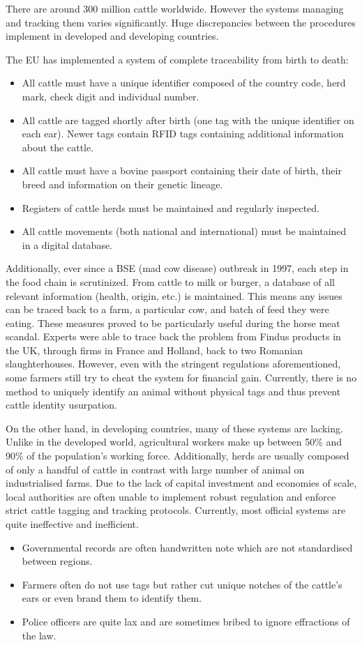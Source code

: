 There are around 300 million cattle worldwide. However the systems managing and tracking them varies significantly. Huge discrepancies between the procedures implement in developed and developing countries.

The EU has implemented a system of complete traceability from birth to death:
\begin{itemize}
	\item All cattle must have a unique identifier composed of the country code, herd mark, check digit and individual number.
	\item All cattle are tagged shortly after birth (one tag with the unique identifier on each ear). Newer tags contain RFID tags containing additional information about the cattle. 
	\item All cattle must have a bovine passport containing their date of birth, their breed and information on their genetic lineage.
	\item Registers of cattle herds must be maintained and regularly inspected.
	\item All cattle movements (both national and international) must be maintained in a digital database.
\end{itemize}

Additionally, ever since a BSE (mad cow disease) outbreak in 1997, each step in the food chain is scrutinized. From cattle to milk or burger, a database of all relevant information (health, origin, etc.) is maintained. This means any issues can be traced back to a farm, a particular cow, and batch of feed they were eating. These measures proved to be particularly useful during the horse meat scandal. Experts were able to trace back the problem from Findus products in the UK, through firms in France and Holland, back to two Romanian slaughterhouses. However, even with the stringent regulations aforementioned, some farmers still try to cheat the system for financial gain. Currently, there is no method to uniquely identify an animal without physical tags and thus prevent cattle identity usurpation.

On the other hand, in developing countries, many of these systems are lacking. Unlike in the developed world, agricultural workers make up between 50\% and 90\% of the population’s working force. Additionally, herds are usually composed of only a handful of cattle in contrast with large number of animal on industrialised farms. Due to the lack of capital investment and economies of scale, local authorities are often unable to implement robust regulation and enforce strict cattle tagging and tracking protocols. Currently, most official systems are quite ineffective and inefficient.
\begin{itemize}
	\item Governmental records are often handwritten note which are not standardised between regions.
	\item Farmers often do not use tags but rather cut unique notches of the cattle’s ears or even brand them to identify them.
	\item Police officers are quite lax and are sometimes bribed to ignore effractions of the law.
\end{itemize}

